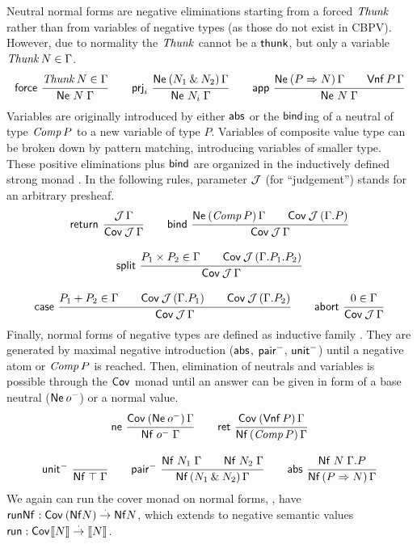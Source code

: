 \documentclass[sigplan,screen]{acmart}
\begin{document}
Neutral normal forms  are negative eliminations
starting from a forced $\mathit{Thunk}$ rather than from variables of negative
types (as those do not exist in CBPV).  However, due to normality
the $\mathit{Thunk}$ cannot be a $\mathsf{thunk}$, but only a variable
$\mathit{Thunk}\,N \in \Gamma$.
\begin{gather*}
  \nru{\tforce}{\Thunk N \in \Gamma}{\Ne N \Gamma}
\qquad
  \nru{\tprj_i}
      {\NeP {N_1 \ntimes N_2} \Gamma}
      {\Ne {N_i} \Gamma}
\qquad
  \nru{\tapp}
      {\NeP {P \To N} \Gamma \qquad \PValNf P \Gamma}
      {\Ne N \Gamma}
\end{gather*}
Variables are originally introduced by either $\mathsf{abs}$ or
the $\mathsf{bind}$ing of a neutral of type $\mathit{Comp}\,P$ to a new variable of type
$P$.  Variables of composite value type can be broken down by pattern
matching, introducing variables of smaller type.  These positive
eliminations plus $\mathsf{bind}$ are organized in the
inductively defined strong monad \fbox{$\Cov$}.
In the following rules, parameter $\mathcal{J}$ (for ``judgement'') stands for an
arbitrary presheaf.
\begin{gather*}
  \nru{\treturn}{\J\,\Gamma}{\Cover \J \Gamma}
\qquad
  \nru{\tbind}
      {\NeP {\Comp P} \Gamma \qquad \Cover \J (\cext \Gamma P)}
      {\Cover \J \Gamma}
\\[2ex]
  \nru{\tsplit}
      {P_1 \times P_2 \in \Gamma \qquad
       \Cover \J (\cext {\cext \Gamma {P_1}} {P_2})
      }
      {\Cover \J \Gamma}
\\[2ex]
  \nru{\tcase}
      {P_1 + P_2 \in \Gamma
       \qquad \Cover \J (\cext \Gamma {P_1})
       \qquad \Cover \J (\cext \Gamma {P_2})
      }
      {\Cover \J \Gamma}
\qquad
  \nru{\tabort}
      {\tyempty \in \Gamma}
      {\Cover \J \Gamma}
\end{gather*}
Finally, normal forms of negative types are defined as inductive
family .  They are generated by maximal negative
introduction ($\mathsf{abs}$, $\mathsf{pair}^-$, $\mathsf{unit}^-$) until a negative atom or
$\mathit{Comp}\,P$ is reached.  Then, elimination of neutrals and variables is
possible through the $\Cov$ monad until an answer can be given in form
of a base neutral ($\mathsf{Ne}^{}\,o^-$) or a normal value.
\begin{gather*}
  \nru{\tne}
      {\CoverP {\tNe\,\natom} \Gamma}
      {\Nf {\natom} \Gamma}
\qquad
  \nru{\tret}
      {\CoverP {\tVNf\,P}  \Gamma}
      {\NfP {\Comp P} \Gamma}
\\[2ex]
  \nru{\nunit}{}{\Nf \top \Gamma}
\qquad
  \nru{\npair}
      {\Nf {N_1} \Gamma \qquad \Nf {N_2} \Gamma}
      {\NfP {N_1 \ntimes N_2} \Gamma}
\qquad
  \nru{\tabs}
      {\Nf N {\cext \Gamma P}}
      {\NfP {P \To N} \Gamma}
\end{gather*}
We again can run the cover monad on normal forms, \ie, have
$\mathsf{runNf}^{} : \mathsf{Cov}^{}\,(\mathsf{Nf} N) \stackrel{\cdot}{\to} \mathsf{Nf} N$, which extends to
negative semantic values
$\mathsf{run} : \mathsf{Cov}^{} \mathopen{{[\kern-0.14em[}} N \mathclose{{]\kern-0.14em]}} \stackrel{\cdot}{\to} \mathopen{{[\kern-0.14em[}} N \mathclose{{]\kern-0.14em]}}$.
\end{document}
